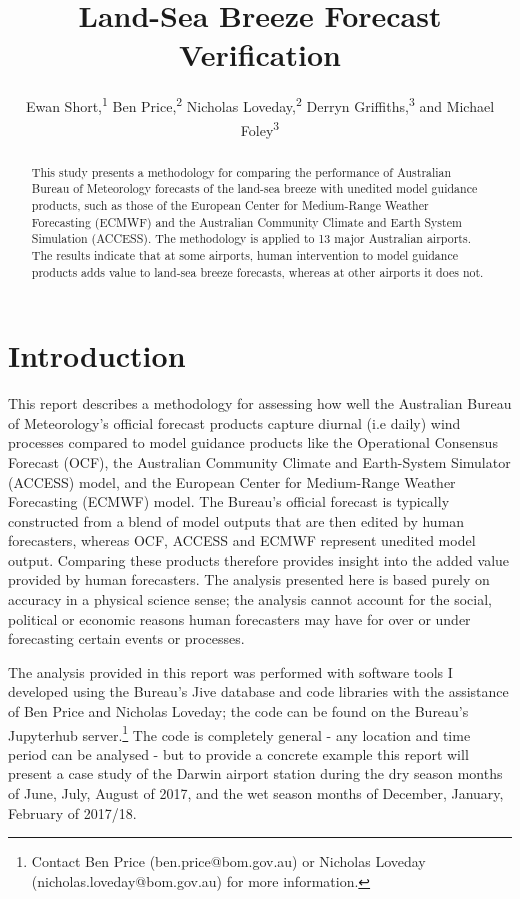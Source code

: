 \documentclass[10pt]{article}
\title{Land-Sea Breeze Forecast Verification}
\author{Ewan Short,\textsuperscript{1} Ben Price,\textsuperscript{2} Nicholas Loveday,\textsuperscript{2} Derryn Griffiths,\textsuperscript{3} and Michael Foley\textsuperscript{3}}
\begin{document}
\maketitle


\begin{abstract}
\noindent This study presents a methodology for comparing the performance of Australian Bureau of Meteorology forecasts of the land-sea breeze with unedited model guidance products, such as those of the European Center for Medium-Range Weather Forecasting (ECMWF) and the Australian Community Climate and Earth System Simulation (ACCESS). The methodology is applied to 13 major Australian airports. The results indicate that at some airports, human intervention to model guidance products adds value to land-sea breeze forecasts, whereas at other airports it does not.    
\end{abstract}


\section{Introduction}\label{introduction}
This report describes a methodology for assessing how well the Australian Bureau of Meteorology's official forecast products capture diurnal (i.e daily) wind processes compared to model guidance products like the Operational Consensus Forecast (OCF), the Australian Community Climate and Earth-System Simulator (ACCESS) model, and the European Center for Medium-Range Weather Forecasting (ECMWF) model. The Bureau's official forecast is typically constructed from a blend of model outputs that are then edited by human forecasters, whereas OCF, ACCESS and ECMWF represent unedited model output. Comparing these products therefore provides insight into the added value provided by human forecasters. The analysis presented here is based purely on accuracy in a physical science sense; the analysis cannot account for the social, political or economic reasons human forecasters may have for over or under forecasting certain events or processes.

The analysis provided in this report was performed with software tools I developed using the Bureau's Jive database and code libraries with the assistance of Ben Price and Nicholas Loveday; the code can be found on the Bureau's Jupyterhub server.\footnote{Contact Ben Price (ben.price@bom.gov.au) or Nicholas Loveday (nicholas.loveday@bom.gov.au) for more information.} The code is completely general - any location and time period can be analysed - but to provide a concrete example this report will present a case study of the Darwin airport station during the dry season months of June, July, August of 2017, and the wet season months of December, January, February of 2017/18. 
\end{document}
